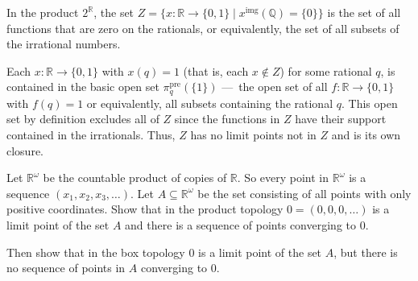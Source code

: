 \documentclass[12 pt, letterpaper]{hmcpset}
\begin{document}
\begin{solution}
	In the product $2^\mathbb{R}$, the set $Z = \{ x : \mathbb{R} \to \{ 0, 1 \} \mid x^\text{img}(\mathbb{Q}) = \{ 0 \} \}$ is the set of all functions that are zero on the rationals, or equivalently, the set of all subsets of the irrational numbers.

	Each $x : \mathbb{R} \to \{ 0, 1 \}$ with $x(q) = 1$ (that is, each $x \not\in Z$) for some rational $q$, is contained in the basic open set $\pi_{q}^\text{pre}(\{ 1 \})$ — the open set of all $f : \mathbb{R} \to \{ 0, 1 \}$ with $f(q) = 1$ or equivalently, all subsets containing the rational $q$. This open set by definition excludes all of $Z$ since the functions in $Z$ have their support contained in the irrationals. Thus, $Z$ has no limit points not in $Z$ and is its own closure.
\end{solution}

\pagebreak

\begin{problem}[3.41]
	Let $\mathbb{R}^{\omega}$ be the countable product of copies of $\mathbb{R}$. So every point in $\mathbb{R}^{\omega}$ is a sequence $(x_{1}, x_{2}, x_{3}, \dots)$. Let $A \subseteq \mathbb{R}^{\omega}$ be the set consisting of all points with only positive coordinates. Show that in the product topology $0 = (0, 0, 0, \dots)$ is a limit point of the set $A$ and there is a sequence of points converging to $0$.
	
	Then show that in the box topology $0$ is a limit point of the set $A$, but there is no sequence of points in $A$ converging to $0$.
\end{problem}
\end{document}
